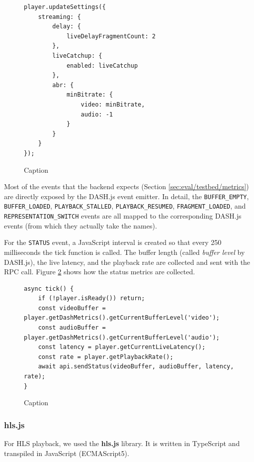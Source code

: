 \begin{figure}
    \centering
    \begin{verbatim}
player.updateSettings({
    streaming: {
        delay: {
            liveDelayFragmentCount: 2
        },
        liveCatchup: {
            enabled: liveCatchup
        },
        abr: {
            minBitrate: {
                video: minBitrate,
                audio: -1
            }
        }
    }
});
    \end{verbatim}
    \caption{Caption}
    \label{fig:dashjs_settings}
\end{figure}

Most of the events that the backend expects (Section \ref{sec:eval/testbed/metrics}) are directly exposed by the DASH.js event emitter. In detail, the \texttt{BUFFER\_EMPTY}, \texttt{BUFFER\_LOADED}, \texttt{PLAYBACK\_STALLED}, \texttt{PLAYBACK\_RESUMED}, \texttt{FRAGMENT\_LOADED}, and \texttt{REPRESENTATION\_SWITCH} events are all mapped to the corresponding DASH.js events (from which they actually take the names).

For the \texttt{STATUS} event, a JavaScript interval is created so that every 250 milliseconds the tick function is called. The buffer length (called \textit{buffer level} by DASH.js), the live latency, and the playback rate are collected and sent with the RPC call. Figure \ref{fig:dashjs_tick} shows how the status metrics are collected.

\begin{figure}
    \centering
    \begin{verbatim}
async tick() {
    if (!player.isReady()) return;
    const videoBuffer = player.getDashMetrics().getCurrentBufferLevel('video');
    const audioBuffer = player.getDashMetrics().getCurrentBufferLevel('audio');
    const latency = player.getCurrentLiveLatency();
    const rate = player.getPlaybackRate();
    await api.sendStatus(videoBuffer, audioBuffer, latency, rate);
}
    \end{verbatim}
    \caption{Caption}
    \label{fig:dashjs_tick}
\end{figure}

\subsubsection{hls.js}
\label{sec:eval/testbed/frontend/hlsjs}

For HLS playback, we used the \textbf{hls.js} library. It is written in TypeScript and transpiled in JavaScript (ECMAScript5).

